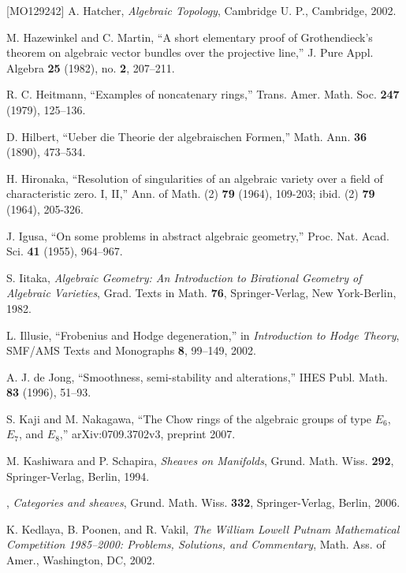 \begin{thebibliography}{[MO129242]}
A. Hatcher, \emph{Algebraic Topology}, Cambridge U. P., Cambridge, 2002.

M. Hazewinkel and C. Martin, ``A short elementary proof of Grothendieck's
theorem on algebraic vector bundles over the projective line,'' J. Pure Appl.
Algebra \textbf{25} (1982), no. \textbf{2}, 207--211.

R. C. Heitmann, ``Examples of noncatenary rings,'' Trans. Amer. Math. Soc.
\textbf{247} (1979), 125--136.

D. Hilbert, ``Ueber die Theorie der algebraischen Formen,'' Math. Ann.
\textbf{36} (1890), 473--534.

H. Hironaka, ``Resolution of singularities of an algebraic variety over a
field of characteristic zero. I, II,'' Ann. of Math. (2) \textbf{79} (1964),
109-203; ibid. (2) \textbf{79} (1964), 205-326.

J. Igusa, ``On some problems in abstract algebraic geometry,'' Proc. Nat.
Acad. Sci. \textbf{41} (1955), 964--967.

S. Iitaka, \emph{Algebraic Geometry: An Introduction to Birational Geometry of
Algebraic Varieties}, Grad. Texts in Math. \textbf{76}, Springer-Verlag, New
York-Berlin, 1982.

L. Illusie, ``Frobenius and Hodge degeneration,'' in \emph{Introduction to
Hodge Theory}, SMF/AMS Texts and Monographs \textbf{8}, 99--149, 2002.

A. J. de Jong, ``Smoothness, semi-stability and alterations,'' IHES Publ.
Math. \textbf{83} (1996), 51--93.

S. Kaji and M. Nakagawa, ``The Chow rings of the algebraic groups of type
$E_6$, $E_7$, and $E_8$,'' arXiv:0709.3702v3, preprint 2007.

M. Kashiwara and P. Schapira, \emph{Sheaves on Manifolds}, Grund. Math. Wiss.
\textbf{292}, Springer-Verlag, Berlin, 1994.

\sameauthor, \emph{Categories and sheaves}, Grund. Math. Wiss. \textbf{332},
Springer-Verlag, Berlin, 2006.

K. Kedlaya, B. Poonen, and R. Vakil, \emph{The William Lowell Putnam
Mathematical Competition 1985--2000: Problems, Solutions, and Commentary},
Math. Ass. of Amer., Washington, DC, 2002.


\end{thebibliography}
